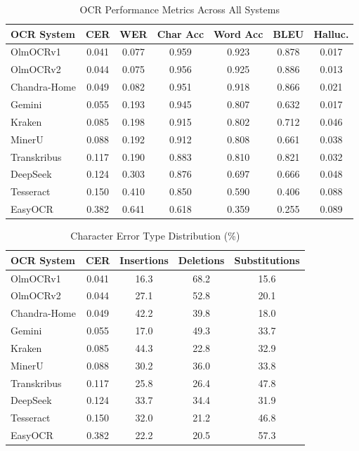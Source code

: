 
\begin{table}[htbp]
\centering
\caption{OCR Performance Metrics Across All Systems}
\label{tab:ocr_overall_performance}
\begin{tabular}{lcccccc}
\toprule
\textbf{OCR System} & \textbf{CER} & \textbf{WER} & \textbf{Char Acc} & \textbf{Word Acc} & \textbf{BLEU} & \textbf{Halluc.} \\
\midrule
OlmOCRv1 & 0.041 & 0.077 & 0.959 & 0.923 & 0.878 & 0.017 \\
OlmOCRv2 & 0.044 & 0.075 & 0.956 & 0.925 & 0.886 & 0.013 \\
Chandra-Home & 0.049 & 0.082 & 0.951 & 0.918 & 0.866 & 0.021 \\
Gemini & 0.055 & 0.193 & 0.945 & 0.807 & 0.632 & 0.017 \\
Kraken & 0.085 & 0.198 & 0.915 & 0.802 & 0.712 & 0.046 \\
MinerU & 0.088 & 0.192 & 0.912 & 0.808 & 0.661 & 0.038 \\
Transkribus & 0.117 & 0.190 & 0.883 & 0.810 & 0.821 & 0.032 \\
DeepSeek & 0.124 & 0.303 & 0.876 & 0.697 & 0.666 & 0.048 \\
Tesseract & 0.150 & 0.410 & 0.850 & 0.590 & 0.406 & 0.088 \\
EasyOCR & 0.382 & 0.641 & 0.618 & 0.359 & 0.255 & 0.089 \\
\bottomrule
\end{tabular}
\end{table}


\begin{table}[htbp]
\centering
\caption{Character Error Type Distribution (\%)}
\label{tab:error_distribution}
\begin{tabular}{lcccc}
\toprule
\textbf{OCR System} & \textbf{CER} & \textbf{Insertions} & \textbf{Deletions} & \textbf{Substitutions} \\
\midrule
OlmOCRv1 & 0.041 & 16.3 & 68.2 & 15.6 \\
OlmOCRv2 & 0.044 & 27.1 & 52.8 & 20.1 \\
Chandra-Home & 0.049 & 42.2 & 39.8 & 18.0 \\
Gemini & 0.055 & 17.0 & 49.3 & 33.7 \\
Kraken & 0.085 & 44.3 & 22.8 & 32.9 \\
MinerU & 0.088 & 30.2 & 36.0 & 33.8 \\
Transkribus & 0.117 & 25.8 & 26.4 & 47.8 \\
DeepSeek & 0.124 & 33.7 & 34.4 & 31.9 \\
Tesseract & 0.150 & 32.0 & 21.2 & 46.8 \\
EasyOCR & 0.382 & 22.2 & 20.5 & 57.3 \\
\bottomrule
\end{tabular}
\end{table}


